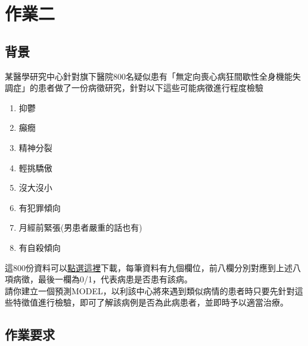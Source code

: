 \documentclass[a4paper,12pt]{article}
\begin{document}
\section{作業二}
\label{sec:org9456fba}
\subsection{背景}
\label{sec:orgee4de4a}
某醫學研究中心針對旗下醫院800名疑似患有「無定向喪心病狂間歇性全身機能失調症」的患者做了一份病徵研究，針對以下這些可能病徵進行程度檢驗\\
\begin{enumerate}
\item 抑鬱\\
\item 癲癇\\
\item 精神分裂\\
\item 輕挑驕傲\\
\item 沒大沒小\\
\item 有犯罪傾向\\
\item 月經前緊張(男患者嚴重的話也有)\\
\item 有自殺傾向\\
\end{enumerate}
這800份資料可以\href{https://letranger.github.io/downloads/qq.csv}{點選這裡}下載，每筆資料有九個欄位，前八欄分別對應到上述八項病徵，最後一欄為0/1，代表病患是否患有該病。\\

請你建立一個預測MODEL，以利該中心將來遇到類似病情的患者時只要先針對這些特徵值進行檢驗，即可了解該病例是否為此病患者，並即時予以適當治療。\\
\subsection{作業要求}
\label{sec:org492d5bc}
\end{document}
